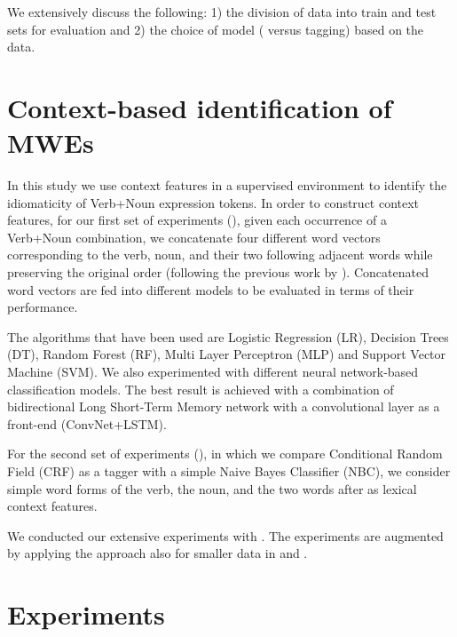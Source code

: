 \documentclass[output=paper,modfonts,nonflat]{langsci/langscibook}
\begin{document}
We extensively discuss the following: 1) the division of data into train and test sets for evaluation and 2) the choice of model ( versus tagging) based on the data.

\section{Context-based identification of MWEs}

In this study we use context features in a supervised environment to identify the idiomaticity of Verb+Noun expression tokens. %
In order to construct context features, for our first set of experiments (), given each occurrence of a Verb+Noun combination, we concatenate four different word vectors corresponding to the verb, noun, and their two following adjacent words while preserving the original order (following the previous work by \citealt{taslimipoor2017}). Concatenated word vectors are fed into different  models to be evaluated in terms of their performance.

The  algorithms that have been used are Logistic Regression (LR), Decision Trees (DT), Random Forest (RF), Multi Layer Perceptron (MLP) and Support Vector Machine (SVM). 
We also experimented with different neural network-based classification models. The best result is achieved with a combination of bidirectional Long Short-Term Memory network with a convolutional layer as a front-end (ConvNet+LSTM).  

For the second set of experiments (), in which we compare Conditional Random Field (CRF) as a tagger with a simple Naive Bayes Classifier (NBC), we consider simple word forms of the verb, the noun, and the two words after as lexical context features.

We conducted our extensive experiments with . The experiments are augmented by applying the approach also for smaller data in  and .

\section{Experiments}
\end{document}
